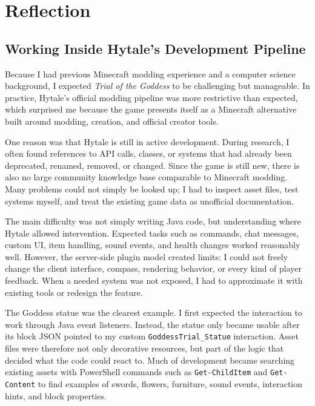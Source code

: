 \section{Reflection}

\subsection{Working Inside Hytale's Development Pipeline}

Because I had previous Minecraft modding experience and a computer science background,
I expected \textit{Trial of the Goddess} to be challenging but manageable.
In practice,
Hytale's official modding pipeline was more restrictive than expected,
which surprised me because the game presents itself as a Minecraft alternative
built around modding,
creation,
and official creator tools.

One reason was that Hytale is still in active development.
During research,
I often found references to API calls,
classes,
or systems that had already been deprecated,
renamed,
removed,
or changed.
Since the game is still new,
there is also no large community knowledge base comparable to Minecraft modding.
Many problems could not simply be looked up;
I had to inspect asset files,
test systems myself,
and treat the existing game data as unofficial documentation.

The main difficulty was not simply writing Java code,
but understanding where Hytale allowed intervention.
Expected tasks such as commands,
chat messages,
custom UI,
item handling,
sound events,
and health changes worked reasonably well.
However,
the server-side plugin model created limits:
I could not freely change the client interface,
compass,
rendering behavior,
or every kind of player feedback.
When a needed system was not exposed,
I had to approximate it with existing tools
or redesign the feature.

The Goddess statue was the clearest example.
I first expected the interaction to work through Java event listeners.
Instead,
the statue only became usable after its block JSON pointed to my custom
\texttt{GoddessTrial\_Statue} interaction.
Asset files were therefore not only decorative resources,
but part of the logic that decided what the code could react to.
Much of development became searching existing assets with PowerShell commands
such as \texttt{Get-ChildItem} and \texttt{Get-Content}
to find examples of swords,
flowers,
furniture,
sound events,
interaction hints,
and block properties.

